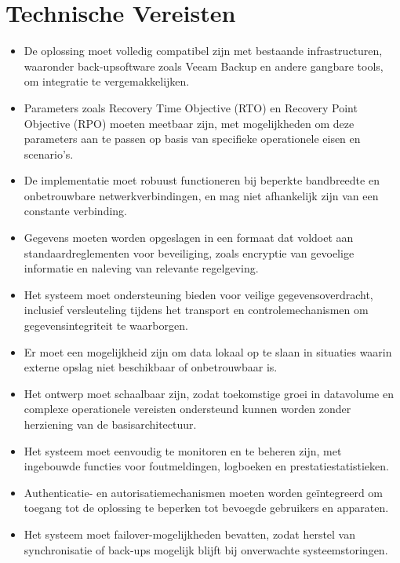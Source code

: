 \documentclass{hogent-article}
\begin{document}
    \section{Technische Vereisten}
    \begin{itemize}
    \item De oplossing moet volledig compatibel zijn met bestaande infrastructuren, waaronder back-upsoftware zoals Veeam Backup en andere gangbare tools, om integratie te vergemakkelijken.
    \item Parameters zoals Recovery Time Objective (RTO) en Recovery Point Objective (RPO) moeten meetbaar zijn, met mogelijkheden om deze parameters aan te passen op basis van specifieke operationele eisen en scenario's.
    \item De implementatie moet robuust functioneren bij beperkte bandbreedte en onbetrouwbare netwerkverbindingen, en mag niet afhankelijk zijn van een constante verbinding.
    \item Gegevens moeten worden opgeslagen in een formaat dat voldoet aan standaardreglementen voor beveiliging, zoals encryptie van gevoelige informatie en naleving van relevante regelgeving.
    \item Het systeem moet ondersteuning bieden voor veilige gegevensoverdracht, inclusief versleuteling tijdens het transport en controlemechanismen om gegevensintegriteit te waarborgen.
    \item Er moet een mogelijkheid zijn om data lokaal op te slaan in situaties waarin externe opslag niet beschikbaar of onbetrouwbaar is.
    \item Het ontwerp moet schaalbaar zijn, zodat toekomstige groei in datavolume en complexe operationele vereisten ondersteund kunnen worden zonder herziening van de basisarchitectuur.
    \item Het systeem moet eenvoudig te monitoren en te beheren zijn, met ingebouwde functies voor foutmeldingen, logboeken en prestatiestatistieken.
    \item Authenticatie- en autorisatiemechanismen moeten worden geïntegreerd om toegang tot de oplossing te beperken tot bevoegde gebruikers en apparaten.
    \item Het systeem moet failover-mogelijkheden bevatten, zodat herstel van synchronisatie of back-ups mogelijk blijft bij onverwachte systeemstoringen.
    \end{itemize}

    
\end{document}
